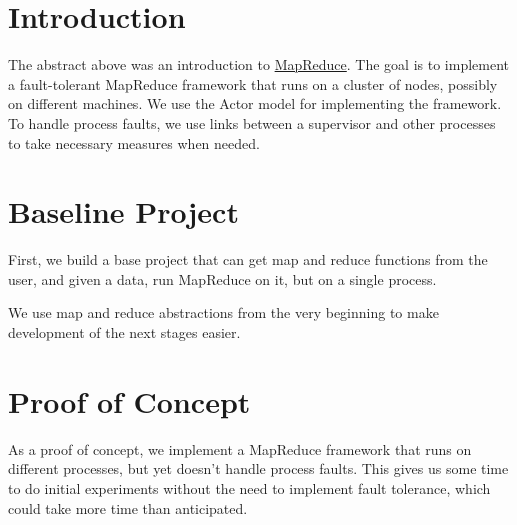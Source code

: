 \documentclass{article} %
\title{\centering{(Practical) Project Proposal: A Map-Reduce framework}}
\author{Soroosh Zare \\
\href{mailto:soroosh.zare00@gmail.com}{soroosh.zare00@gmail.com} \\
\AND
Farzin Nasiri \\
\href{mailto:farzin-nasiri@hotmail.com}{farzin-nasiri@hotmail.com}
}
\begin{document}
\maketitle

\begin{abstract}
Consider  $\{P,M, R\}$, where $P$ is an abstract problem, $M$ is a function which solves problems $P'$ in the same class of problems as $P$, and $R$ is a function that merges the result of smaller sub-problems to achieve the solution for a bigger problem. Usaully $R$ is called \textbf{Reduce} from our point of view. Now, given these 2 functions, we can use them to solve $P$ even if they are black boxes, and we have no understanding of how they work. We can go further and divide the computation between different processes and provide them the function $M$, and finally use $R$ on the gathered result to reach a final answer. The benefit of this solution is that the work can be done in parallel. The goal of this project is to implement a MapReduce framework built on top of this abstraction and do some experiments of different scenarios. If we look at $M$ not as a function that solve a whole problem, but as a function that transforms data, it would be called the \textbf{Map} function.
\end{abstract}

\section{Introduction}
The abstract above was an introduction to \href{https://en.wikipedia.org/wiki/MapReduce}{MapReduce}. The goal is to implement a fault-tolerant MapReduce framework that runs on a cluster of nodes, possibly on different machines. We use the Actor model for implementing the framework. To handle process faults, we use links between a supervisor and other processes to take necessary measures when needed.


\section{Baseline Project}
First, we build a base project that can get map and reduce functions from the user, and given a data, run MapReduce on it, but on a single process.

We use map and reduce abstractions from the very beginning to make development of the next stages easier.

\section{Proof of Concept}
As a proof of concept, we implement a MapReduce framework that runs on different processes, but yet doesn't handle process faults. This gives us some time to do initial experiments without the need to implement fault tolerance, which could take more time than anticipated.
\end{document}
